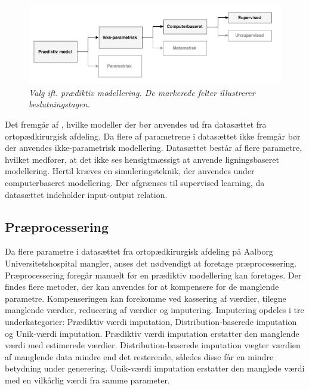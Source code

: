 \begin{figure}[H]
	\centering
	\includegraphics[scale=.73]{figures/praediktivmodel.png}
	\caption{\textit{Valg ift. prædiktiv modellering. De markerede felter illustrerer beslutningstagen.}}
	\label{praediktiv}
\end{figure}

\noindent 
Det fremgår af , hvilke modeller der bør anvendes ud fra datasættet fra ortopædkirurgisk afdeling.
Da flere af parametrene i datasættet ikke fremgår bør der anvendes ikke-parametrisk modellering. Datasættet består af flere parametre, hvilket medfører, at det ikke ses hensigtmæssigt at anvende ligningsbaseret modellering. Hertil kræves en simuleringsteknik, der anvendes under computerbaseret modellering. Der afgrænses til supervised learning, da datasættet indeholder input-output relation.


\subsection{Præprocessering}
Da flere parametre i datasættet fra ortopædkirurgisk afdeling på Aalborg Universitetshospital mangler, anses det nødvendigt at foretage præprocessering. Præprocessering foregår manuelt før en prædiktiv modellering kan foretages.
Der findes flere metoder, der kan anvendes for at kompensere for de manglende parametre. Kompenseringen kan forekomme ved kassering af værdier, tilegne manglende værdier, reducering af værdier og imputering. Imputering opdeles i tre underkategorier: Prædiktiv værdi imputation, Distribution-baserede imputation og Unik-værdi imputation. Prædiktiv værdi imputation erstatter den manglende værdi med estimerede værdier. Distribution-baserede imputation vægter værdien af manglende data mindre end det resterende, således disse får en mindre betydning under generering. Unik-værdi imputation  erstatter den manglede værdi med en vilkårlig værdi fra samme parameter.\cite{Saar2007} 


